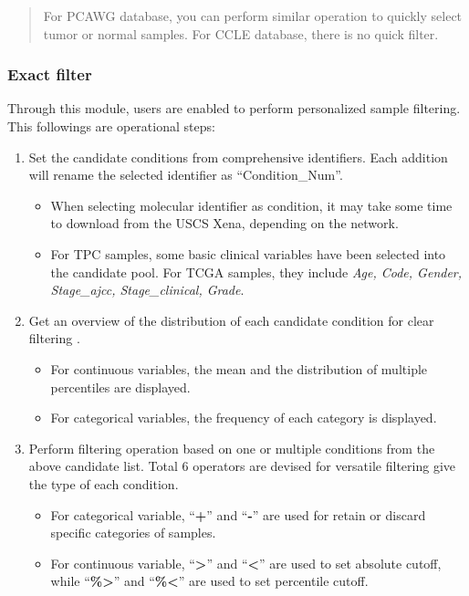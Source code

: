 \documentclass[
]{book}
\providecommand{\tightlist}{%
  \setlength{\itemsep}{0pt}\setlength{\parskip}{0pt}}
\begin{document}
\begin{quote}
For PCAWG database, you can perform similar operation to quickly select tumor or normal samples. For CCLE database, there is no quick filter.
\end{quote}

\subsubsection{Exact filter}\label{exact-filter}

Through this module, users are enabled to perform personalized sample filtering. This followings are operational steps:

\begin{enumerate}
\def\labelenumi{\arabic{enumi}.}
\tightlist
\item
  Set the candidate conditions from comprehensive identifiers. Each addition will rename the selected identifier as ``Condition\_Num''.

  \begin{itemize}
  \tightlist
  \item
    When selecting molecular identifier as condition, it may take some time to download from the USCS Xena, depending on the network.
  \item
    For TPC samples, some basic clinical variables have been selected into the candidate pool. For TCGA samples, they include \emph{Age, Code, Gender, Stage\_ajcc, Stage\_clinical, Grade}.
  \end{itemize}
\item
  Get an overview of the distribution of each candidate condition for clear filtering .

  \begin{itemize}
  \tightlist
  \item
    For continuous variables, the mean and the distribution of multiple percentiles are displayed.
  \item
    For categorical variables, the frequency of each category is displayed.
  \end{itemize}
\item
  Perform filtering operation based on one or multiple conditions from the above candidate list. Total 6 operators are devised for versatile filtering give the type of each condition.

  \begin{itemize}
  \tightlist
  \item
    For categorical variable, ``\textbf{+}'' and ``\textbf{-}'' are used for retain or discard specific categories of samples.
  \item
    For continuous variable, ``\textbf{\textgreater{}}'' and ``\textbf{\textless{}}'' are used to set absolute cutoff, while ``\textbf{\%\textgreater{}}'' and ``\textbf{\%\textless{}}'' are used to set percentile cutoff.
  \end{itemize}
\end{enumerate}
\end{document}
